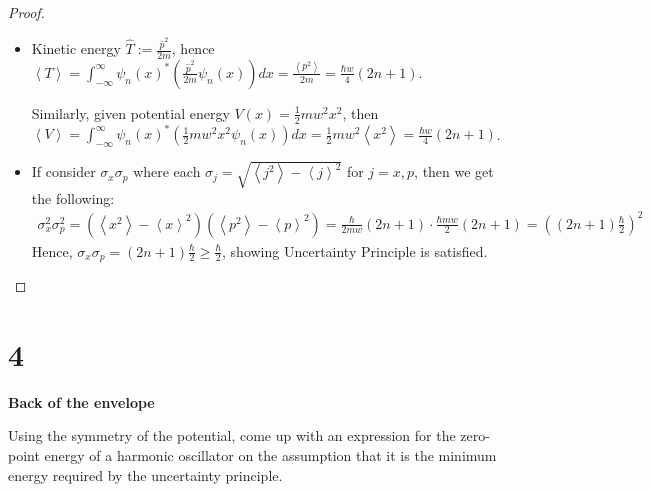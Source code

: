 \documentclass{article}
\begin{document}
\begin{proof}
\begin{itemize}
        \begin{align}
            \left<p^2\right> &= \int_{-\infty}^{\infty}\psi_n(x)^*(\hat{p}^2 \psi_n(x))dx = \int_{-\infty}^{\infty}(\hat{p}\psi_n(x))^*(\hat{p}\psi_n(x))dx\\
            &= \frac{\hbar mw}{2}\int_{-\infty}^{\infty}(a^+\psi_n(x)-a^-\psi_n(x))^*(a^+\psi_n(x)-a^-\psi_n(x))dx\\
            &= \frac{\hbar mw}{2}\int_{-\infty}^{\infty}(\sqrt{n+1}\psi_{n+1}(x)-\sqrt{n}\psi_{n-1}(x))^*(\sqrt{n+1}\psi_{n+1}(x)-\sqrt{n}\psi_{n-1}(x))dx\\
            &= \frac{\hbar mw}{2}\|\sqrt{n+1}\psi_{n+1}(x)-\sqrt{n}\psi_{n-1}(x)\|^2 = \frac{\hbar mw}{2}(\|\sqrt{n+1}\psi_{n+1}\|^2+\|\sqrt{n}\psi_{n-1}\|^2)\\
            &= \frac{\hbar mw}{2}((n+1)+n)=\frac{\hbar mw}{2}(2n+1)
        \end{align}

        \hfil

        \item[(b)]Kinetic energy $\hat{T}:=\frac{\hat{p}^2}{2m}$, hence $\left<T\right>=\int_{-\infty}^{\infty}\psi_n(x)^* (\frac{\hat{p}^2}{2m}\psi_n(x))dx = \frac{\left<p^2\right>}{2m} = \frac{\hbar w}{4}(2n+1)$.
        
        Similarly, given potential energy $V(x)=\frac{1}{2}mw^2 x^2$, then $\left<V\right>=\int_{-\infty}^{\infty}\psi_n(x)^* (\frac{1}{2}mw^2 x^2\psi_n(x))dx = \frac{1}{2}mw^2 \left<x^2\right> = \frac{\hbar w}{4}(2n+1)$.

        \hfil

        \item[(c)] If consider $\sigma_x\sigma_p$ where each $\sigma_j=\sqrt{\left<j^2\right>-\left<j\right>^2}$ for $j=x,p$, then we get the following:
        \begin{align}
            \sigma_x^2\sigma_p^2=(\left<x^2\right>-\left<x\right>^2)(\left<p^2\right>-\left<p\right>^2) = \frac{\hbar}{2mw}(2n+1)\cdot\frac{\hbar mw}{2}(2n+1) = \left((2n+1)\frac{\hbar}{2}\right)^2
        \end{align}
        Hence, $\sigma_x\sigma_p = (2n+1)\frac{\hbar}{2}\geq \frac{\hbar}{2}$, showing Uncertainty Principle is satisfied.
    \end{itemize}
\end{proof}

\newpage

\section*{4}
\begin{ques}\label{q4}
\textbf{Back of the envelope}

Using the symmetry of the potential, come up with an expression for the zero-point energy
of a harmonic oscillator on the assumption that it is the minimum energy required by the
uncertainty principle.
\end{ques}
\end{document}
